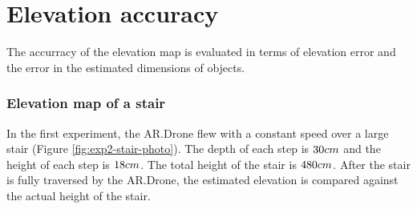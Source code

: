 \clearpage
\section{Elevation accuracy}
\label{sec:results-elevation-accuracy}
The accurracy of the elevation map is evaluated in terms of elevation error and the error in the estimated dimensions of objects.

\subsubsection{Elevation map of a stair}

In the first experiment, the AR.Drone flew with a constant speed over a large stair (Figure \ref{fig:exp2-stair-photo}).
The depth of each step is $30\begin{small}cm\end{small}$ and the height of each step is $18\begin{small}cm\end{small}$.
The total height of the stair is $480\begin{small}cm\end{small}$.
After the stair is fully traversed by the AR.Drone, the estimated elevation is compared against the actual height of the stair.

